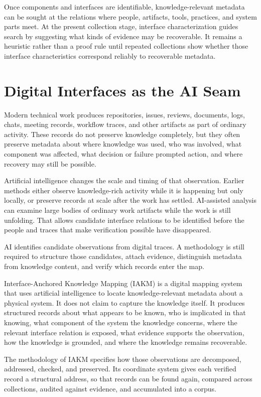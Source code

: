 \documentclass[conference]{IEEEtran}
\begin{document}
Once components and interfaces are identifiable, knowledge-relevant metadata can be sought at the relations where people, artifacts, tools, practices, and system parts meet. At the present collection stage, interface characterization guides search by suggesting what kinds of evidence may be recoverable. It remains a heuristic rather than a proof rule until repeated collections show whether those interface characteristics correspond reliably to recoverable metadata.


\section{Digital Interfaces as the AI Seam}\label{sec:4}

Modern technical work produces repositories, issues, reviews, documents, logs, chats, meeting records, workflow traces, and other artifacts as part of ordinary activity. These records do not preserve knowledge completely, but they often preserve metadata about where knowledge was used, who was involved, what component was affected, what decision or failure prompted action, and where recovery may still be possible.

Artificial intelligence changes the scale and timing of that observation. Earlier methods either observe knowledge-rich activity while it is happening but only locally, or preserve records at scale after the work has settled. AI-assisted analysis can examine large bodies of ordinary work artifacts while the work is still unfolding. That allows candidate interface relations to be identified before the people and traces that make verification possible have disappeared.

AI identifies candidate observations from digital traces. A methodology is still required to structure those candidates, attach evidence, distinguish metadata from knowledge content, and verify which records enter the map.

Interface-Anchored Knowledge Mapping (IAKM) is a digital mapping system that uses artificial intelligence to locate knowledge-relevant metadata about a physical system. It does not claim to capture the knowledge itself. It produces structured records about what appears to be known, who is implicated in that knowing, what component of the system the knowledge concerns, where the relevant interface relation is exposed, what evidence supports the observation, how the knowledge is grounded, and where the knowledge remains recoverable.

The methodology of IAKM specifies how those observations are decomposed, addressed, checked, and preserved. Its coordinate system gives each verified record a structural address, so that records can be found again, compared across collections, audited against evidence, and accumulated into a corpus.
\end{document}
